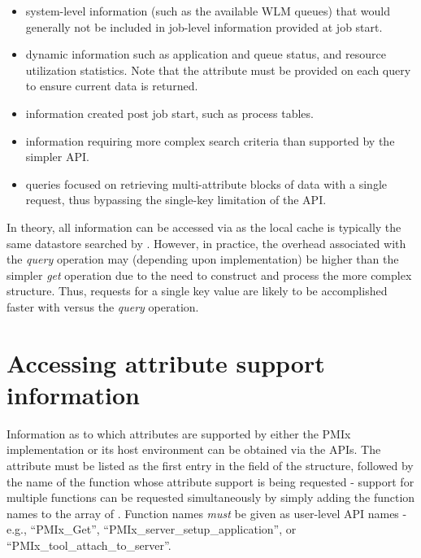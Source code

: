 \begin{itemize}
\item system-level information (such as the available \ac{WLM} queues) that would generally not be included in job-level information provided at job start.
\item dynamic information such as application and queue status, and resource utilization statistics. Note that the  attribute must be provided on each query to ensure current data is returned.
\item information created post job start, such as process tables.
\item information requiring more complex search criteria than supported by the simpler  \ac{API}.
\item queries focused on retrieving multi-attribute blocks of data with a single request, thus bypassing the single-key limitation of the  \ac{API}.
\end{itemize}

In theory, all information can be accessed via  as the local cache is typically the same datastore searched by . However, in practice, the overhead associated with the \emph{query} operation may (depending upon implementation) be higher than the simpler \emph{get} operation due to the need to construct and process the more complex  structure. Thus, requests for a single key value are likely to be accomplished faster with  versus the \emph{query} operation.


\section{Accessing attribute support information}
\label{chap:api_job_mgmt:queryattrs}

Information as to which attributes are supported by either the \ac{PMIx} implementation or its host environment can be obtained via the  \acp{API}. The  attribute must be listed as the first entry in the  field of the  structure, followed by the name of the function whose attribute support is being requested - support for multiple functions can be requested simultaneously by simply adding the function names to the array of . Function names \emph{must} be given as user-level \ac{API} names - e.g., ``PMIx_Get'', ``PMIx_server_setup_application'', or ``PMIx_tool_attach_to_server''.

